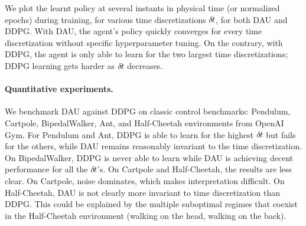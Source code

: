 We plot the learnt policy at several instants in physical time (or
normalized epochs) during training, for various time discretizations
${\delta\hspace{-.1em}t}$, for both DAU and DDPG. With DAU, the agent's policy quickly
converges for every time discretization without specific hyperparameter
tuning. On the contrary, with DDPG, the agent is only able to learn for
the two largest time discretizations; DDPG learning gets harder as ${\delta\hspace{-.1em}t}$ decreases.

\paragraph{Quantitative experiments.}
We benchmark DAU against DDPG on classic control benchmarks: Pendulum,
Cartpole, BipedalWalker, Ant, and Half-Cheetah environments from OpenAI
Gym. For Pendulum and Ant, DDPG is able to learn for the highest
${\delta\hspace{-.1em}t}$ but fails for the others, while DAU remains reasonably
invariant to the time discretization. On BipedalWalker, DDPG is never
able to learn while DAU is achieving decent performance for all the
${\delta\hspace{-.1em}t}$'s. On Cartpole and Half-Cheetah, the results are less clear. On
Cartpole, noise dominates, which makes interpretation difficult. On Half-Cheetah, DAU is not clearly more invariant to time discretization than
DDPG. This could be explained by the multiple suboptimal regimes that
coexist in the Half-Cheetah environment (walking on the head, walking on
the back). 


% 

